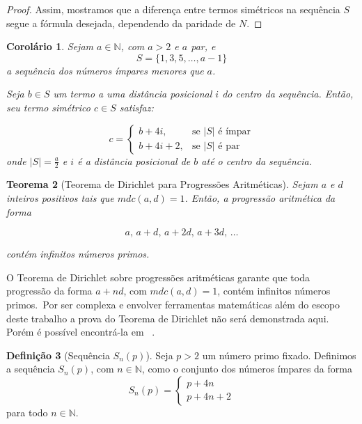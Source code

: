 \documentclass[a4paper,11pt]{article}
\newtheorem{theorem}{Teorema}[section]
\newtheorem{corollary}[theorem]{Corolário}
\theoremstyle{definition}
\newtheorem{definition}[theorem]{Definição}
\theoremstyle{remark}
\begin{document}
\begin{otherlanguage}{brazil}
\begin{proof}
		Assim, mostramos que a diferença entre termos simétricos na sequência $S$ segue a fórmula desejada, dependendo da paridade de $N$.
		
	\end{proof}
	
	\begin{corollary} \label{coro:par_simetrico}
		Sejam $a \in \mathbb{N}$, com $a > 2$ e $a$ par, e
		\[
		S = \{1, 3, 5, \dotsc, a - 1\}
		\]
		a sequência dos números ímpares menores que $a$.
		
		Seja $b \in S$ um termo a uma distância posicional $i$ do centro da sequência. Então, seu termo simétrico $c \in S$ satisfaz:
		
		\[
		c =
		\begin{cases}
			b + 4i, & \text{se } |S| \text{ é ímpar} \\
			b + 4i + 2, & \text{se } |S| \text{ é par}
		\end{cases}
		\]
		onde $|S| = \frac{a}{2}$ e $i$ é a distância posicional de $b$ até o centro da sequência.
	\end{corollary}
	
	
	
	\begin{theorem}[Teorema de Dirichlet para Progressões Aritméticas] \label{teo:dirichlet}
		Sejam $a$ e $d$ inteiros positivos tais que $mdc(a, d) = 1$. Então, a progressão aritmética da forma
		
		\[
		a,\, a + d,\, a + 2d,\, a + 3d,\, \dots
		\]
		
		contém infinitos números primos.
	\end{theorem}
	
	O Teorema de Dirichlet sobre progressões aritméticas garante que toda progressão da forma $a + nd$, com $mdc(a, d) = 1$, contém infinitos números primos.~Por ser complexa e envolver ferramentas matemáticas além do escopo deste trabalho a prova do Teorema de Dirichlet não será demonstrada aqui. Porém é possível encontrá-la em ~\cite{apostol}.  
	
	\begin{definition}[Sequência \(S_n(p)\)]\label{def:snp}
		Seja \(p > 2\) um número primo fixado. Definimos a sequência \(S_n(p)\), com \(n \in \mathbb{N}\), como o conjunto dos números ímpares da forma
		\[
		S_n(p) = 
		\begin{cases}
			p + 4n \\
			p + 4n + 2
		\end{cases}
		\]
		para todo \(n \in \mathbb{N}\).
	\end{definition}
	

\end{otherlanguage}
\end{document}
